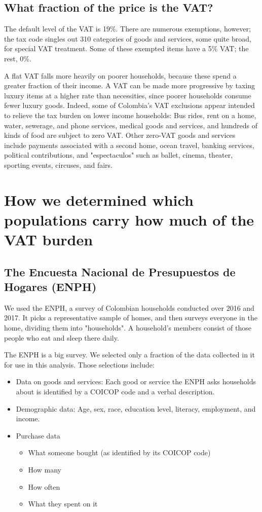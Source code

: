\documentclass[preprint,12pt]{elsarticle}
\begin{document}
\subsection{What fraction of the price is the VAT?}

The default level of the VAT is 19\%. There are numerous exemptions, however; the tax code singles out 310 categories of goods and services, some quite broad, for special VAT treatment. Some of these exempted items have a 5\% VAT; the rest, 0\%.

A flat VAT falls more heavily on poorer households, because these spend a greater fraction of their income. A VAT can be made more progressive by taxing luxury items at a higher rate than necessities, since poorer households consume fewer luxury goods. Indeed, some of Colombia's VAT exclusions appear intended to relieve the tax burden on lower income households: Bus rides, rent on a home, water, sewerage, and phone services, medical goods and services, and hundreds of kinds of food are subject to zero VAT. Other zero-VAT goods and services include payments associated with a second home, ocean travel, banking services, political contributions, and "espectaculos" such as ballet, cinema, theater, sporting events, circuses, and fairs.


\section{How we determined which populations carry how much of the VAT burden}

\subsection{The Encuesta Nacional de Presupuestos de Hogares (ENPH)}

We used the ENPH, a survey of Colombian households conducted over 2016 and 2017. It picks a representative sample of homes, and then surveys everyone in the home, dividing them into "households". A household's members consist of those people who eat and sleep there daily.

The ENPH is a big survey. We selected only a fraction of the data collected in it for use in this analysis. Those selections include:

\begin{itemize}
  \item Data on goods and services: Each good or service the ENPH asks households about is identified by a COICOP code and a verbal description.
  \item  Demographic data: Age, sex, race, education level, literacy, employment, and income.
  \item  Purchase data
  \begin{itemize}
      \item  What someone bought (as identified by its COICOP code)
      \item  How many
      \item  How often
      \item  What they spent on it
  \end{itemize}
\end{itemize}
\end{document}
